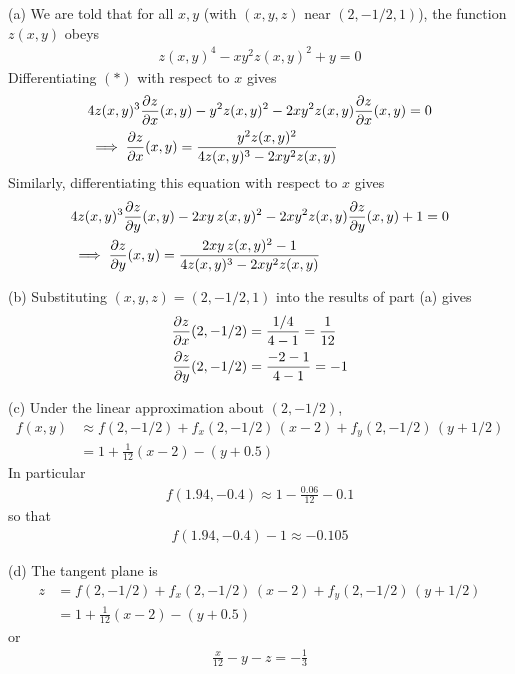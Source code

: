 \begin{solution}
(a) 
We are told that for all $x,y$ (with $(x,y,z)$ near $(2,-1/2,1)$),
the function $z(x,y)$ obeys
\begin{align*}
z(x,y)^4 -xy^2 z(x,y)^2 +y=0
\tag{$*$}\end{align*}
Differentiating $(*)$ with respect to $x$ gives
\begin{align*}
&4z(x,y)^3\pdiff{z}{x}(x,y) - y^2z(x,y)^2 -2xy^2z(x,y)\pdiff{z}{x}(x,y) =0 \\
&\implies 
\pdiff{z}{x}(x,y) = \frac{y^2 z(x,y)^2}{4z(x,y)^3-2xy^2z(x,y)}
\end{align*}
Similarly, differentiating this equation with respect to $x$ gives
\begin{align*}
&4z(x,y)^3\pdiff{z}{y}(x,y) - 2xy\,z(x,y)^2 -2xy^2z(x,y)\pdiff{z}{y}(x,y) +1=0 \\
&\implies 
\pdiff{z}{y}(x,y) = \frac{2xy\, z(x,y)^2-1}{4z(x,y)^3-2xy^2z(x,y)}
\end{align*}

(b) Substituting $(x, y, z) = (2, -1/2, 1)$ into the results of part (a)
gives
\begin{align*}
\pdiff{z}{x}(2,-1/2) &= \frac{1/4}{4-1} =\frac{1}{12}\\
\pdiff{z}{y}(2,-1/2) &= \frac{-2-1}{4-1}=-1
\end{align*}

(c) Under the linear approximation about $(2,-1/2)$,
\begin{align*}
f(x,y) &\approx f(2,-1/2) + f_x(2,-1/2)\,(x-2) + f_y(2,-1/2)\,(y+1/2) \\
       &= 1 +\frac{1}{12}(x-2) - (y+0.5)
\end{align*}
In particular
\begin{align*}
f(1.94,-0.4) \approx 1 -\frac{0.06}{12}-0.1 
\end{align*}
so that
\begin{align*}
f(1.94,-0.4) - 1  \approx -0.105
\end{align*}

(d) The tangent plane is
\begin{align*}
z&=f(2,-1/2) + f_x(2,-1/2)\,(x-2) + f_y(2,-1/2)\,(y+1/2) \\
 &= 1 +\frac{1}{12}(x-2) - (y+0.5)
\end{align*}
or
\begin{align*}
\frac{x}{12} -y -z = -\frac{1}{3}
\end{align*}
\end{solution}

